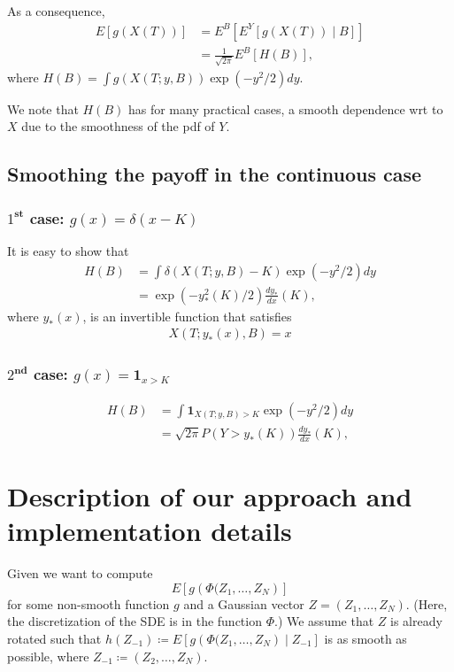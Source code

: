 \documentclass[11pt]{article}
\begin{document}
As a consequence,
\begin{align}\label{conditional_expectation_transformation}
	E[g(X(T))]&= E^B[E^Y[g(X(T))\mid B]]\nonumber\\
	&=\frac{1}{\sqrt{2 \pi}} E^B[H(B)],
\end{align}
where $H(B)=\int g(X(T;y,B)) \operatorname{exp}(-y^2/2) dy$.

We note that $H(B)$ has for many practical cases, a smooth dependence wrt to $X$ due to the smoothness of the pdf of $Y$.

\subsection{Smoothing the payoff in the continuous case}



\subsubsection{$1^{\textbf{st}}$ case: $g(x)=\delta(x-K)$}
It is easy to show that
\begin{align}\label{smoothed_integrand_delta}
	H(B)&= \int \delta(X(T;y,B)-K) \operatorname{exp}(-y^2/2) dy \nonumber\\
	&= \operatorname{exp}(-y^2_{\ast}(K)/2) \frac{d y_{\ast}}{dx}(K),
\end{align}
where $y_{\ast}(x)$, is an invertible function that satisfies 
\begin{align}
	X(T;y_{\ast}(x),B)=x	
\end{align}
\subsubsection{$2^{\textbf{nd}}$ case: $g(x)=\mathbf{1}_{x>K}$}
\begin{align}\label{smoothed_integrand_binary_opt}
	H(B)&= \int \mathbf{1}_{X(T;y,B)>K} \operatorname{exp}(-y^2/2) dy \nonumber\\
	&= \sqrt{2 \pi} P(Y>y_{\ast}(K)) \frac{d y_{\ast}}{dx}(K),
\end{align}




\section{Description of our approach and implementation details}
\label{sec:plan-work-misc}

Given we want to compute
\begin{equation}\label{QoI}
E\left[ g\left( \Phi(Z_1, \ldots, Z_N \right) \right]
\end{equation}
for some non-smooth function $g$ and a Gaussian vector $Z=(Z_1,\dots,Z_N)$. (Here, the
discretization of the SDE is in the function $\Phi$.) We assume that
$Z$ is already rotated such that $h(Z_{-1}) \coloneqq E\left[ g\left(
\Phi(Z_1, \ldots, Z_N \right) \mid Z_{-1}\right]$ is as smooth as
possible, where $Z_{-1} \coloneqq (Z_2, \ldots, Z_N)$. 
\end{document}
